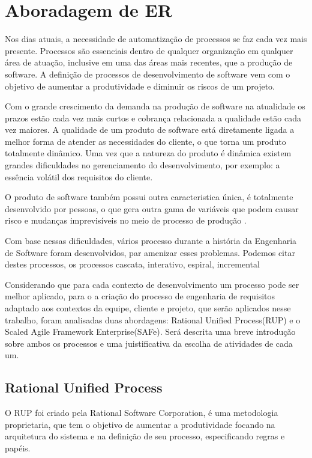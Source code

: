 \chapter[Aboradagem de ER]{Aboradagem de ER}\label{cap3}

Nos dias atuais, a necessidade de automatização de processos se faz cada vez mais
presente. Processos são essenciais dentro de qualquer organização em qualquer área
de atuação, inclusive em uma das áreas mais recentes, que a produção de software.
A definição de processos de desenvolvimento de software vem com o objetivo de aumentar
a produtividade e diminuir os riscos de um projeto.

Com o grande crescimento da demanda na produção de software
na atualidade os prazos estão cada vez mais curtos e cobrança relacionada a qualidade
estão cada vez maiores. A qualidade de um produto de software está diretamente ligada
a melhor forma de atender as necessidades do cliente, o que torna um produto totalmente dinâmico.
Uma vez que a natureza do produto é dinâmica existem grandes dificuldades no gerenciamento
do desenvolvimento, por exemplo: a essência volátil dos requisitos do cliente.

O produto de software também possui outra caracteristica única, é totalmente desenvolvido
por pessoas, o que gera outra gama de variáveis que podem causar risco e mudanças
imprevisíveis no meio de processo de produção \cite{SCHWABER}.

Com base nessas dificuldades, vários processo durante a história da Engenharia de
Software foram desenvolvidos, par amenizar esses problemas. Podemos citar destes
processos, os processos cascata, interativo, espiral, incremental

Considerando que para cada contexto de desenvolvimento um processo pode ser melhor
aplicado, para o a criação do processo de engenharia de requisitos adaptado aos
contextos da equipe, cliente e projeto, que serão aplicados nesse trabalho, foram
analisadas duas abordagens: Rational Unified Process(RUP) e o Scaled Agile Framework
Enterprise(SAFe). Será descrita uma breve introdução sobre ambos os processos e uma
juistificativa da escolha de atividades de cada um.

\section{Rational Unified Process}

O RUP foi criado pela Rational Software Corporation, é uma metodologia proprietaria,
que tem o objetivo de aumentar a produtividade focando na arquitetura do sistema
e na definição de seu processo, especificando regras e papéis.


